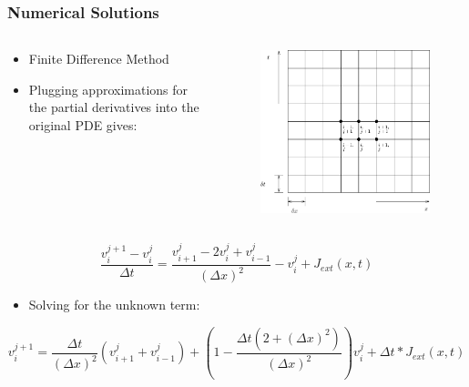 \documentclass{beamer}
\begin{document}
\begin{frame}
\frametitle{Numerical Solutions}
\begin{columns}


\begin{column}{.6\textwidth}
\begin{itemize}
	\item{Finite Difference Method}
	\item{Plugging approximations for the partial derivatives into the original PDE gives:}
\end{itemize}
\end{column}
\begin{column}{.4\textwidth}
\begin{figure}[H]
  \includegraphics[width=\linewidth]{grid.png}
  \label{fig:sketch3}
\end{figure}
\end{column}
\end{columns}
\[\frac{v^{j+1}_i-v^j_i}{\Delta{t}}=\frac{v^{j}_{i+1}-2v^j_i+v^j_{i-1}}{(\Delta{x})^2}-v^j_i+J_{ext}(x,t)\]
\begin{itemize}
	\item{Solving for the unknown term:}
\end{itemize}
\[v^{j+1}_i=\frac{\Delta{t}}{(\Delta{x})^2}(v^{j}_{i+1}+v^{j}_{i-1})+(1-\frac{\Delta{t}(2+(\Delta{x})^2)}{(\Delta{x})^2})v^{j}_{i}+\Delta{t}*J_{ext}(x,t)\]
\end{frame}
\end{document}
